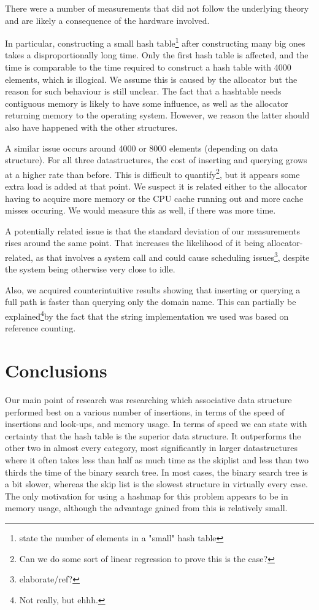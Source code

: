 \documentclass[12pt,a4paper]{article}
\begin{document}
    There were a number of measurements that did not follow the underlying theory and are likely a
    consequence of the hardware involved.

    In particular, constructing a small hash table\footnote{state the number of elements in a "small" hash table}
    after constructing many big ones takes a disproportionally long time.  Only the first hash table is affected, 
    and the time is comparable to the time required to construct a hash table with 4000 elements, which is illogical.
    We assume this is caused by the allocator but the reason for such behaviour is still unclear.  The fact
    that a hashtable needs contiguous memory is likely to have some influence, as well as the
    allocator returning memory to the operating system.  However, we reason the latter should also have happened
    with the other structures.

    A similar issue occurs around 4000 or 8000 elements (depending on data structure).  For all three
    datastructures, the cost of inserting and querying grows at a higher rate than before.  This is difficult to
    quantify\footnote{Can we do some sort of linear regression to prove this is the case?}, but it
    appears some extra load is added at that point.  We suspect it is related either to the
    allocator having to acquire more memory or the CPU cache running out and more cache misses occuring.
    We would measure this as well, if there was more time.

    A potentially related issue is that the standard deviation of our measurements rises around the
    same point.  That increases the likelihood of it being allocator-related, as that involves a
    system call and could cause scheduling issues\footnote{elaborate/ref?}, despite the system being 
    otherwise very close to idle.

    Also, we acquired counterintuitive results showing that inserting or querying a full path is
    faster than querying only the domain name.  This can partially be explained\footnote{Not really,
    but ehhh.}by the fact that the string implementation we used was based on reference counting.

    \section{Conclusions}
    Our main point of research was researching which associative data structure performed best on
    a various number of insertions, in terms of the speed of insertions and look-ups, and memory usage.
    In terms of speed we can state with certainty that the hash table is the superior data structure.
    It outperforms the other two in almost every category, most significantly in larger datastructures where
    it often takes less than half as much time as the skiplist and less than two thirds the time of the binary search tree.
    In most cases, the binary search tree is a bit slower, whereas the skip list is the slowest structure in
    virtually every case. The only motivation for using a hashmap for this problem appears to be in memory usage,
    although the advantage gained from this is relatively small.
    
\end{document}
